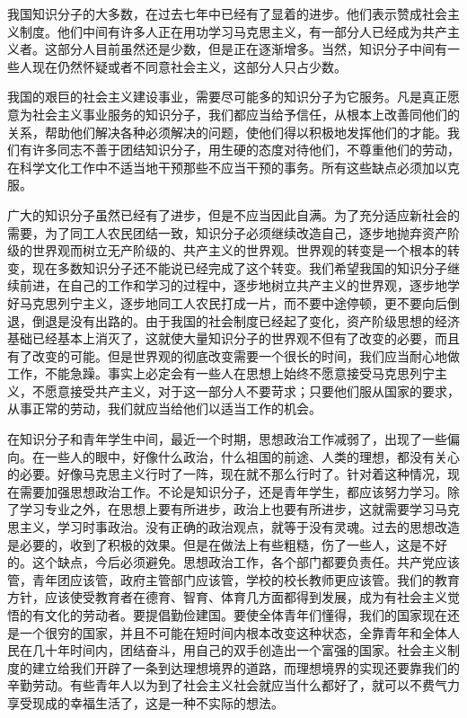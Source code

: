 \documentclass[UTF8, 12pt, a4paper]{ctexrep}
\begin{document}
我国知识分子的大多数，在过去七年中已经有了显着的进步。他们表示赞成社会主义制度。他们中间有许多人正在用功学习马克思主义，有一部分人已经成为共产主义者。这部分人目前虽然还是少数，但是正在逐渐增多。当然，知识分子中间有一些人现在仍然怀疑或者不同意社会主义，这部分人只占少数。

我国的艰巨的社会主义建设事业，需要尽可能多的知识分子为它服务。凡是真正愿意为社会主义事业服务的知识分子，我们都应当给予信任，从根本上改善同他们的关系，帮助他们解决各种必须解决的问题，使他们得以积极地发挥他们的才能。我们有许多同志不善于团结知识分子，用生硬的态度对待他们，不尊重他们的劳动，在科学文化工作中不适当地干预那些不应当干预的事务。所有这些缺点必须加以克服。

广大的知识分子虽然已经有了进步，但是不应当因此自满。为了充分适应新社会的需要，为了同工人农民团结一致，知识分子必须继续改造自己，逐步地抛弃资产阶级的世界观而树立无产阶级的、共产主义的世界观。世界观的转变是一个根本的转变，现在多数知识分子还不能说已经完成了这个转变。我们希望我国的知识分子继续前进，在自己的工作和学习的过程中，逐步地树立共产主义的世界观，逐步地学好马克思列宁主义，逐步地同工人农民打成一片，而不要中途停顿，更不要向后倒退，倒退是没有出路的。由于我国的社会制度已经起了变化，资产阶级思想的经济基础已经基本上消灭了，这就使大量知识分子的世界观不但有了改变的必要，而且有了改变的可能。但是世界观的彻底改变需要一个很长的时间，我们应当耐心地做工作，不能急躁。事实上必定会有一些人在思想上始终不愿意接受马克思列宁主义，不愿意接受共产主义，对于这一部分人不要苛求；只要他们服从国家的要求，从事正常的劳动，我们就应当给他们以适当工作的机会。

在知识分子和青年学生中间，最近一个时期，思想政治工作减弱了，出现了一些偏向。在一些人的眼中，好像什么政治，什么祖国的前途、人类的理想，都没有关心的必要。好像马克思主义行时了一阵，现在就不那么行时了。针对着这种情况，现在需要加强思想政治工作。不论是知识分子，还是青年学生，都应该努力学习。除了学习专业之外，在思想上要有所进步，政治上也要有所进步，这就需要学习马克思主义，学习时事政治。没有正确的政治观点，就等于没有灵魂。过去的思想改造是必要的，收到了积极的效果。但是在做法上有些粗糙，伤了一些人，这是不好的。这个缺点，今后必须避免。思想政治工作，各个部门都要负责任。共产党应该管，青年团应该管，政府主管部门应该管，学校的校长教师更应该管。我们的教育方针，应该使受教育者在德育、智育、体育几方面都得到发展，成为有社会主义觉悟的有文化的劳动者。要提倡勤俭建国。要使全体青年们懂得，我们的国家现在还是一个很穷的国家，并且不可能在短时间内根本改变这种状态，全靠青年和全体人民在几十年时间内，团结奋斗，用自己的双手创造出一个富强的国家。社会主义制度的建立给我们开辟了一条到达理想境界的道路，而理想境界的实现还要靠我们的辛勤劳动。有些青年人以为到了社会主义社会就应当什么都好了，就可以不费气力享受现成的幸福生活了，这是一种不实际的想法。
\end{document}
